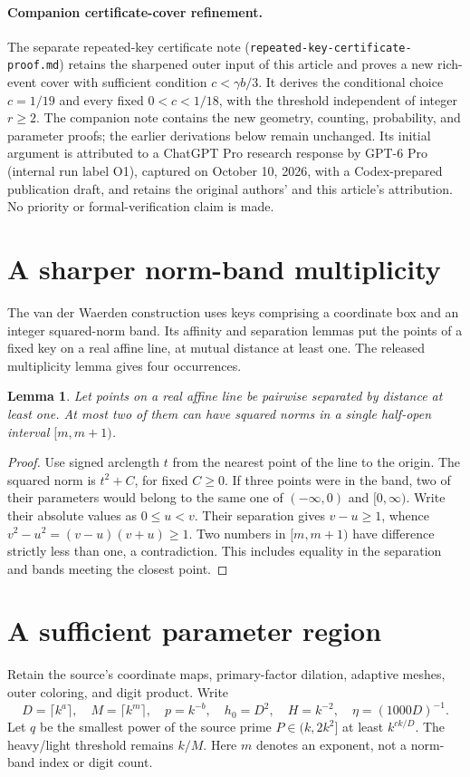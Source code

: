 \documentclass[11pt]{article}
\newtheorem{lemma}{Lemma}
\begin{document}
\paragraph{Companion certificate-cover refinement.}
The separate repeated-key
certificate note (\texttt{repeated-key-certificate-proof.md}) retains the
sharpened outer input of this article and proves a new rich-event cover with sufficient condition $c<\gamma b/3$.
It derives the conditional choice $c=1/19$ and every fixed $0<c<1/18$,
with the threshold independent of integer $r\ge2$. The companion note
contains the new geometry, counting, probability, and parameter proofs;
the earlier derivations below remain unchanged. Its initial argument is
attributed to a ChatGPT Pro research response by GPT-6 Pro (internal run
label O1), captured on October 10, 2026, with a Codex-prepared publication draft, and retains the original
authors' and this article's attribution. No priority or formal-verification
claim is made.

\section{A sharper norm-band multiplicity}
The van der Waerden construction uses keys comprising a coordinate box
and an integer squared-norm band. Its affinity and separation lemmas put
the points of a fixed key on a real affine line, at mutual distance at
least one. The released multiplicity lemma gives four occurrences.

\begin{lemma}\label{lem:band}
Let points on a real affine line be pairwise separated by distance at
least one. At most two of them can have squared norms in a single
half-open interval $[m,m+1)$.
\end{lemma}
\begin{proof}
Use signed arclength $t$ from the nearest point of the line to the origin.
The squared norm is $t^2+C$, for fixed $C\ge0$. If three points were
in the band, two of their parameters would belong to the same one of
$(-\infty,0)$ and $[0,\infty)$. Write their absolute values as
$0\le u<v$. Their separation gives $v-u\ge1$, whence
$v^2-u^2=(v-u)(v+u)\ge1$. Two numbers in $[m,m+1)$ have difference
strictly less than one, a contradiction. This includes equality in the
separation and bands meeting the closest point.
\end{proof}

\section{A sufficient parameter region}
Retain the source's coordinate maps, primary-factor dilation, adaptive
meshes, outer coloring, and digit product. Write
\[
 D=\lceil k^a\rceil,\quad M=\lceil k^m\rceil,\quad
 p=k^{-b},\quad h_0=D^2,\quad H=k^{-2},\quad
 \eta=(1000D)^{-1}.
\]
Let $q$ be the smallest power of the source prime $P\in(k,2k^2]$
at least $k^{ck/D}$. The heavy/light threshold remains $k/M$.
Here $m$ denotes an exponent, not a norm-band index or digit count.
\end{document}
